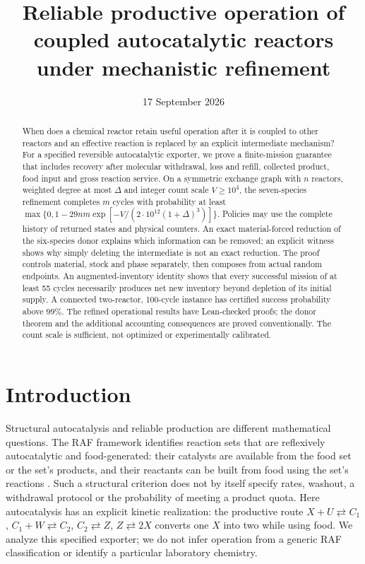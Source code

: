 \documentclass[11pt]{article}
\title{Reliable productive operation of coupled autocatalytic reactors under mechanistic refinement}
\author{}
\date{17 September 2026}
\theoremstyle{definition}\newtheorem{definition}[theorem]{Definition}
\begin{document}
\maketitle
\begin{abstract}
When does a chemical reactor retain useful operation after it is coupled to other
reactors and an effective reaction is replaced by an explicit intermediate mechanism?
For a specified reversible autocatalytic exporter, we prove a finite-mission guarantee
that includes recovery after molecular withdrawal, loss and refill, collected product,
food input and gross reaction service. On a symmetric exchange graph with $n$ reactors,
weighted degree at most $\Delta$ and integer count scale $V\ge10^4$, the seven-species
refinement completes $m$ cycles with probability at least
$\max\{0,1-29nm\exp[-V/(2\cdot10^{12}(1+\Delta)^3)]\}$.
Policies may use the complete history of returned states and physical counters.
An exact material-forced reduction of the six-species donor explains which information
can be removed; an explicit witness shows why simply deleting the intermediate is not
an exact reduction. The proof controls material, stock and phase separately, then
composes from actual random endpoints. An augmented-inventory identity shows that
every successful mission of at least 55 cycles necessarily produces net new inventory
beyond depletion of its initial supply. A connected two-reactor, 100-cycle instance
has certified success probability above $99\%$. The refined operational results have
Lean-checked proofs; the donor theorem and the additional accounting consequences
are proved conventionally. The count scale is sufficient, not optimized or experimentally calibrated.
\end{abstract}

\section{Introduction}
Structural autocatalysis and reliable production are different mathematical questions.
The RAF framework identifies reaction sets that are reflexively autocatalytic and
food-generated: their catalysts are available from the food set or the set's products,
and their reactants can be built from food using the set's reactions
\citep{hordijk2004}. Such a structural criterion does not by itself specify rates,
washout, a withdrawal protocol or the probability of meeting a product quota.
Here autocatalysis has an explicit kinetic realization: the productive route
$X+U\rightleftarrows C_1$, $C_1+W\rightleftarrows C_2$,
$C_2\rightleftarrows Z$, $Z\rightleftarrows2X$ converts one $X$ into two while
using food. We analyze this specified exporter; we do not infer operation from a
generic RAF classification or identify a particular laboratory chemistry.
\end{document}
